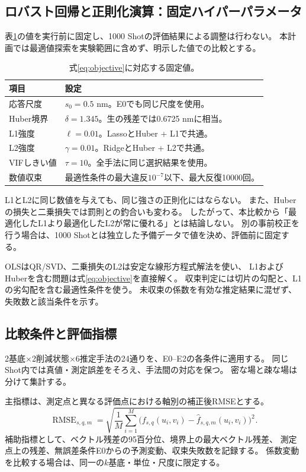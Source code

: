\documentclass[11pt,a4paper]{ltjsarticle}
\newcommand{\RMSE}{\operatorname{RMSE}}
\begin{document}
\subsection{ロバスト回帰と正則化演算：固定ハイパーパラメータ}
表\ref{tab:fixed}の値を実行前に固定し、1000 Shotの評価結果による調整は行わない。
本計画では最適値探索を実験範囲に含めず、明示した値での比較とする。

\begin{table}[htbp]
\centering
\caption{式\eqref{eq:objective}に対応する固定値。}
\label{tab:fixed}
\begin{tabularx}{\linewidth}{lX}
\toprule
項目 & 設定\\
\midrule
応答尺度 & $s_0=0.5$ nm。E0でも同じ尺度を使用。\\
Huber境界 & $\delta=1.345$。生の残差では0.6725 nmに相当。\\
L1強度 & $\ell=0.01$。LassoとHuber + L1で共通。\\
L2強度 & $\gamma=0.01$。RidgeとHuber + L2で共通。\\
VIFしきい値 & $\tau=10$。全手法に同じ選択結果を使用。\\
数値収束 & 最適性条件の最大違反$10^{-7}$以下、最大反復10000回。\\
\bottomrule
\end{tabularx}
\end{table}

L1とL2に同じ数値を与えても、同じ強さの正則化にはならない。
また、Huberの損失と二乗損失では罰則との釣合いも変わる。
したがって、本比較から「最適化したL1より最適化したL2が常に優れる」とは結論しない。
別の事前校正を行う場合は、1000 Shotとは独立した予備データで値を決め、評価前に固定する。

OLSはQR/SVD、二乗損失のL2は安定な線形方程式解法を使い、
L1およびHuberを含む問題は式\eqref{eq:objective}を直接解く。
収束判定には切片の勾配と、L1の劣勾配を含む最適性条件を使う。
未収束の係数を有効な推定結果に混ぜず、失敗数と該当条件を示す。

\subsection{比較条件と評価指標}
2基底$\times$2削減状態$\times$6推定手法の24通りを、E0--E2の各条件に適用する。
同じShot内では真値・測定誤差をそろえ、手法間の対応を保つ。
密な場と疎な場は分けて集計する。

主指標は、測定点と異なる評価点における軸別の補正後RMSEとする。
\begin{equation}
 \RMSE_{s,q,m}=\sqrt{\frac1M\sum_{i=1}^{M}
 \bigl(f_{s,q}(u_i,v_i)-\widehat f_{s,q,m}(u_i,v_i)\bigr)^2}.
 \label{eq:rmse}
\end{equation}
補助指標として、ベクトル残差の95百分位、境界上の最大ベクトル残差、
測定点上の残差、無誤差条件E0からの予測変動、収束失敗数を記録する。
係数変動を比較する場合は、同一の$k$基底・単位・尺度に限定する。
\end{document}
